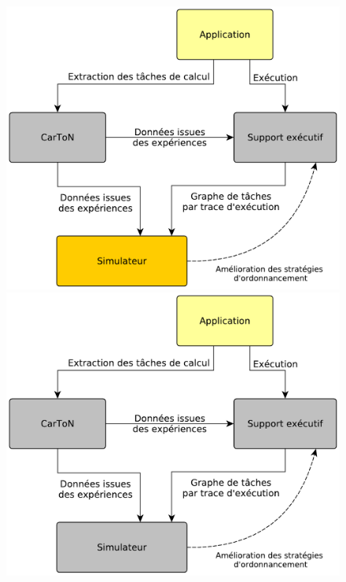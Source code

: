 \documentclass[xcolor={usenames,dvipsnames,svgnames,table}, aspectratio=43]{beamer}
\begin{document}
\begin{frame}
\begin{minipage}[t]{0.60\linewidth}
\begin{figure}
{      }%
       {%
	\includegraphics[width=\textwidth]{graph/big_picture-synt-2.pdf}%
      }%
       {%
	\includegraphics[width=\textwidth]{graph/big_picture-synt-3.pdf}%
      }%
    \end{figure}
  \end{minipage}
\end{frame}
\end{document}
